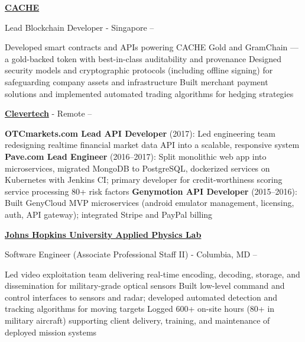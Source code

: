 \documentclass[a4paper,10pt,oneside]{article}
\begin{document}
\begin{body}
\EntryGap

\href{https://cache.gold}
{\textbf{CACHE}}
\par
Lead Blockchain Developer - Singapore
\hfill
{} -- 
\begin{detail}
\BulletItem Developed smart contracts and APIs powering CACHE Gold and GramChain --- a gold-backed token with best-in-class auditability and provenance
\BulletItem Designed security models and cryptographic protocols (including offline signing) for safeguarding company assets and infrastructure
\BulletItem Built merchant payment solutions and implemented automated trading algorithms for hedging strategies
\end{detail}

\EntryGap

\href{http://www.clevertech.biz/}
{\textbf{Clevertech}} - Remote
\hfill
{} -- 
\begin{detail}
\BulletItem \textbf{OTCmarkets.com Lead API Developer} (2017): Led engineering team redesigning realtime financial market data API into a scalable, responsive system
\BulletItem \textbf{Pave.com Lead Engineer} (2016--2017): Split monolithic web app into microservices, migrated MongoDB to PostgreSQL, dockerized services on Kubernetes with Jenkins CI; primary developer for credit-worthiness scoring service processing 80+ risk factors
\BulletItem \textbf{Genymotion API Developer} (2015--2016): Built GenyCloud MVP microservices (android emulator management, licensing, auth, API gateway); integrated Stripe and PayPal billing
\end{detail}

\EntryGap

\href{http://www.jhuapl.edu/}
{\textbf{Johns Hopkins University Applied Physics Lab}}
\par
Software Engineer (Associate Professional Staff II) - Columbia, MD
\hfill
{} --
\begin{detail}
\BulletItem Led video exploitation team delivering real-time encoding, decoding, storage, and dissemination for military-grade optical sensors
\BulletItem Built low-level command and control interfaces to sensors and radar; developed automated detection and tracking algorithms for moving targets
\BulletItem Logged 600+ on-site hours (80+ in military aircraft) supporting client delivery, training, and maintenance of deployed mission systems
\end{detail}


\end{body}
\end{document}
